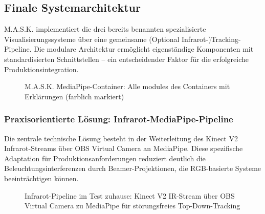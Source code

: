 
\subsection{Finale Systemarchitektur}

M.A.S.K. implementiert die drei bereits benannten spezialisierte Visualisierungssysteme über eine gemeinsame  (Optional Infrarot-)Tracking-Pipeline. Die modulare Architektur ermöglicht eigenständige Komponenten mit standardisierten Schnittstellen – ein entscheidender Faktor für die erfolgreiche Produktionsintegration.

\begin{figure}[htbp]
    \centering
    \caption{M.A.S.K. MediaPipe-Container: Alle modules des Containers mit Erklärungen (farblich markiert)}
    \label{fig:main_interface}
\end{figure}

\subsubsection{Praxisorientierte Lösung: Infrarot-MediaPipe-Pipeline}

Die zentrale technische Lösung besteht in der Weiterleitung des Kinect V2 Infrarot-Streams über OBS Virtual Camera an MediaPipe. Diese spezifische Adaptation für Produktionsanforderungen reduziert deutlich die Beleuchtungsinterferenzen durch Beamer-Projektionen, die RGB-basierte Systeme beeinträchtigen können.

\begin{figure}[htbp]
    \centering
    \caption{Infrarot-Pipeline im Test zuhause: Kinect V2 IR-Stream über OBS Virtual Camera zu MediaPipe für störungsfreies Top-Down-Tracking}
    \label{fig:infrarot_topdown_mapping}
\end{figure}

